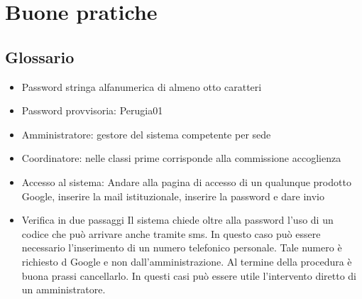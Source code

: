 \chapter{Buone pratiche}
\section{Glossario}
\begin{itemize}
	\item Password stringa alfanumerica di almeno otto caratteri
	\item Password provvisoria: Perugia01
	\item Amministratore: gestore del sistema competente per sede
	\item Coordinatore: nelle classi prime corrisponde alla commissione 
	accoglienza
	\item Accesso al sistema: Andare alla pagina di accesso di un qualunque 
	prodotto Google, inserire la mail istituzionale, inserire la password e 
	dare invio
	\item Verifica in due passaggi Il sistema chiede oltre alla password l'uso 
	di un codice che può arrivare anche tramite sms. In questo caso può essere necessario
	l'inserimento di un numero telefonico personale. Tale numero è richiesto d Google e 
	non dall'amministrazione. Al termine della procedura è buona prassi 
	cancellarlo. In questi casi può essere utile l'intervento diretto di un 
	amministratore.
\end{itemize}
